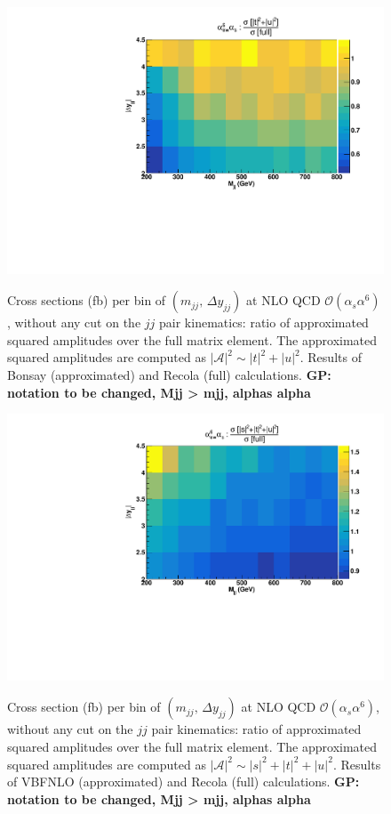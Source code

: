\begin{figure}[h]
\centering
{\includegraphics[scale=0.39]{figures/scanfigures/a6as_VBFNLOVSrecola_tu.pdf}}
\caption{Cross sections (fb) per bin of $(m_{jj},\,\Delta y_{jj})$ at NLO QCD $\mathcal{O}(\alpha_s\alpha^6)$, without any cut on the $jj$ pair kinematics: ratio of approximated squared amplitudes over the full matrix element. The approximated squared amplitudes are computed as $|\mathcal{A}|^2 \sim |t|^2 + |u|^2$. Results of {\sc Bonsay} (approximated) and {\sc Recola} (full) calculations. {\bf GP: notation to be changed, Mjj > mjj, alphas alpha} }\label{fig:ratio2d_NLO}
\end{figure}
\begin{figure}[hbt]
\centering
{\includegraphics[scale=0.39]{figures/scanfigures/a6as_VBFNLOVSrecola_stu.pdf}}
\caption{Cross section (fb) per bin of $(m_{jj},\,\Delta y_{jj})$ at NLO QCD $\mathcal{O}(\alpha_s\alpha^6)$, without any cut on the $jj$ pair kinematics:  ratio of approximated squared amplitudes over the full matrix element. The approximated squared amplitudes are computed as $|\mathcal{A}|^2 \sim |s|^2 + |t|^2 + |u|^2$. Results of {\sc VBFNLO} (approximated) and {\sc Recola} (full) calculations. {\bf GP: notation to be changed, Mjj > mjj, alphas alpha}}\label{fig:mjjdyjj_2d_NLO}
\end{figure}
